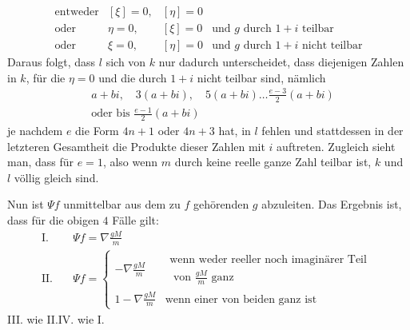 \[
\begin{array}{llll}
\text{entweder}&[\xi]=0,&[\eta]=0&\\
\text{oder}&\eta=0,&[\xi]=0&\text{und }g\text{ durch }1+i\text{ teilbar}\\
\text{oder}&\xi=0,&[\eta]=0&\text{und }g\text{ durch }1+i\text{ nicht teilbar}
\end{array}
\]
Daraus folgt, dass $l$ sich von $k$ nur dadurch unterscheidet, dass diejenigen Zahlen in $k$, für die $\eta=0$ und die durch $1+i$ nicht teilbar sind, nämlich
\[
\begin{aligned}
&a+bi,\quad3(a+bi),\quad5(a+bi)\ldots\frac{e-3}{2}(a+bi)\\
&\text{oder bis }\frac{e-1}{2}(a+bi)
\end{aligned}
\]
je nachdem $e$ die Form $4n+1$ oder $4n+3$ hat, in $l$ fehlen und stattdessen in der letzteren Gesamtheit die Produkte dieser Zahlen mit $i$ auftreten. Zugleich sieht man, dass für $e=1$, also wenn $m$ durch keine reelle ganze Zahl teilbar ist, $k$ und $l$ völlig gleich sind.

Nun ist $\Psi f$ unmittelbar aus dem zu $f$ gehörenden $g$ abzuleiten. Das Ergebnis ist, dass für die obigen $4$ Fälle gilt:
\[
\begin{aligned}
\mathrm{I.}\quad&\Psi f=\nabla\frac{gM}{m}\\
\mathrm{II.}\quad&\Psi f=\left\{\begin{array}{ll}
-\nabla\frac{gM}{m}&\begin{gathered}\text{wenn weder reeller noch imaginärer Teil}\\\text{ von }\frac{gM}{m}\text{ ganz}\end{gathered}\\
1-\nabla\frac{gM}{m}&\text{wenn einer von beiden ganz ist}
\end{array}\right.
\end{aligned}
\]
III. wie II.\quad IV. wie I.
